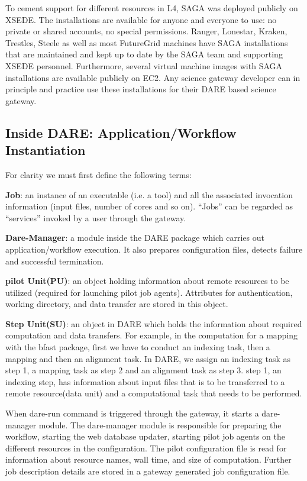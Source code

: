 \documentclass[]{svjour3}
\begin{document}
To cement support for different resources in L4, SAGA was deployed
publicly on XSEDE. The installations are available for anyone and everyone
to use: no private or shared accounts, no special permissions. Ranger,
Lonestar, Kraken, Trestles, Steele as well as most FutureGrid machines
have SAGA installations that are maintained and kept up to date by
the SAGA team and supporting XSEDE personnel. Furthermore, several virtual machine images with
SAGA installations are available publicly on EC2. Any science
gateway developer can in principle and practice use these installations
for their DARE based science gateway.

\subsection{Inside DARE: Application/Workflow Instantiation}

For clarity we must first define the following terms:

\textbf{Job}: an instance of an executable (i.e. a tool) and all the associated
invocation information (input files, number of cores and so on). ``Jobs'' can be
regarded as ``services'' invoked by a user through the gateway.

\textbf{Dare-Manager}: a module inside the DARE package which carries
out application/workflow execution. It also prepares configuration files,
detects failure and successful termination.

\textbf{pilot Unit(PU)}: an object holding information about remote
resources to be utilized (required for launching pilot job agents).
Attributes for authentication, working directory, and data transfer
are stored in this object.

\textbf{Step Unit(SU)}: an object in DARE which holds the information
about required computation and data transfers. For example, in the
computation for a mapping with the bfast package, first we have to
conduct an indexing task, then a mapping and then an alignment task.
In DARE, we assign an indexing task as step 1, a mapping task as step
2 and an alignment task as step 3. step 1, an indexing step, has
information about input files that is to be transferred to a remote
resource(data unit) and a computational task that needs to be
performed.

When dare-run command is triggered through the gateway, it starts a
dare-manager module. The dare-manager module is responsible for preparing the workflow,
starting the web database updater, starting pilot job agents on the
different resources in the configuration. The pilot configuration file is
read for information about resource names, wall time, and size of computation.
Further job description details are stored in a gateway generated job configuration file.
\end{document}
